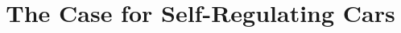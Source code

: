 \documentclass[sigconf,10pt,anonymous,nonacm]{acmart}
\begin{document}
\title[Deployable Self-Regulating Cars]{The Case for Self-Regulating Cars}



\keywords{}

\maketitle








\clearpage


\end{document}
